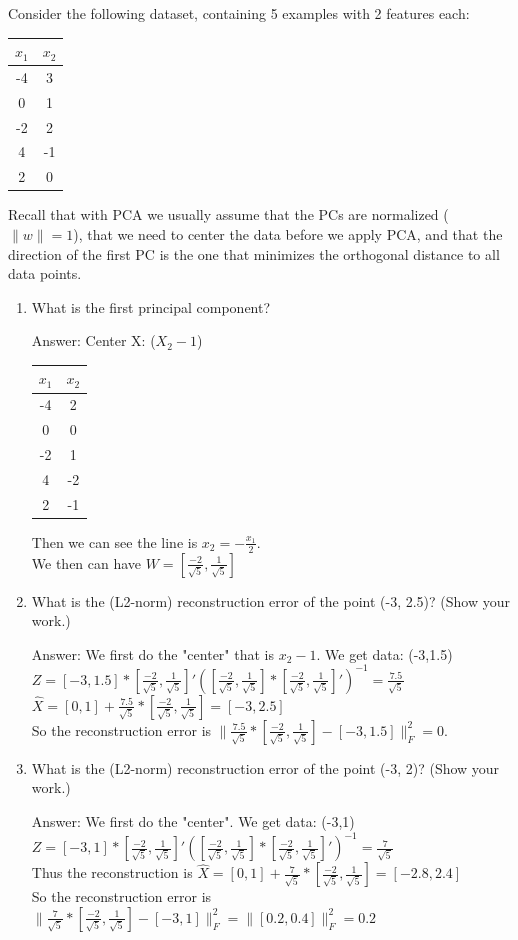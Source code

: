 \documentclass{article}
\def\ans#1{\par\gre{Answer: #1}}
\def\blu#1{{\color{blu}#1}}
\def\gre#1{{\color{gre}#1}}
\def\norm#1{\|#1\|}
\def\enum#1{\begin{enumerate}#1\end{enumerate}}
\begin{document}
Consider the following dataset, containing 5 examples with 2 features each:
\begin{center}
\begin{tabular}{cc}
$x_1$ & $x_2$\\
\hline
-4 & 3\\
0 & 1\\
-2 & 2\\
4 & -1\\
2 & 0\\
\end{tabular}
\end{center}
Recall that with PCA we usually assume that the PCs are normalized ($\norm{w} = 1$), that we need to center the data before we apply PCA, and that the direction of the first PC is the one that minimizes the orthogonal distance to all data points.
\blu{
\enum{
\item What is the first principal component?
\ans{
    Center X: ($X_2-1$) \\
    \begin{tabular}{cc}
        $x_1$ & $x_2$\\
        \hline
        -4 & 2\\
        0 & 0\\
        -2 & 1\\
        4 & -2\\
        2 & -1\\
        \end{tabular}
    Then we can see the line is $x_2 = -\frac {x_1} 2$. \\
    We then can have $W = [ \frac {-2} {\sqrt{5}} , \frac{1}{\sqrt{5}}]$
}
\item What is the (L2-norm) reconstruction error of the point (-3, 2.5)? (Show your work.)
\ans{We first do the "center" that is $x_2-1$. We get data: (-3,1.5) \\
   $Z = [-3, 1.5] * [ \frac {-2} {\sqrt{5}} , \frac{1}{\sqrt{5}}]'([ \frac {-2} {\sqrt{5}} , \frac{1}{\sqrt{5}}] * [ \frac {-2} {\sqrt{5}} , \frac{1}{\sqrt{5}}]')^{-1} = \frac{7.5}{\sqrt{5}}$ \\
   $\hat{X} =[0,1] + \frac{7.5}{\sqrt{5}} * [ \frac {-2} {\sqrt{5}} , \frac{1}{\sqrt{5}}] = [-3, 2.5]$\\
   So the reconstruction error is $ \|\frac{7.5}{\sqrt{5}} * [ \frac {-2} {\sqrt{5}} , \frac{1}{\sqrt{5}}] - [-3,1.5]\|_F^2 = 0$.
}
\item What is the (L2-norm) reconstruction error of the point (-3, 2)? (Show your work.)
\ans{
    We first do the "center". We get data: (-3,1) 
    $Z = [-3, 1] * [ \frac {-2} {\sqrt{5}} , \frac{1}{\sqrt{5}}]'([ \frac {-2} {\sqrt{5}} , \frac{1}{\sqrt{5}}] * [ \frac {-2} {\sqrt{5}} , \frac{1}{\sqrt{5}}]')^{-1} = \frac{7}{\sqrt{5}}$ \\
Thus the reconstruction is $\hat{X} =[0,1] + \frac{7}{\sqrt{5}} * [ \frac {-2} {\sqrt{5}} , \frac{1}{\sqrt{5}}] = [-2.8, 2.4]$\\
So the reconstruction error is $ \|\frac{7}{\sqrt{5}} * [ \frac {-2} {\sqrt{5}} , \frac{1}{\sqrt{5}}] - [-3,1]\|_F^2 = \|[0.2, 0.4]\|_F^2 = 0.2$
}
}
}
\end{document}
